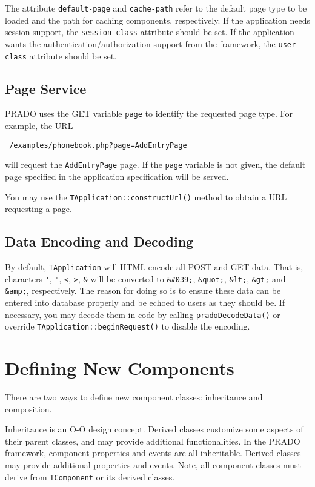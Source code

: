 \documentclass{book}
\begin{document}
The attribute \verb|default-page| and \verb|cache-path| refer to
the default page type to be loaded and the path for caching
components, respectively. If the application needs session
support, the \verb|session-class| attribute should be set. If the
application wants the authentication/authorization support from
the framework, the \verb|user-class| attribute should be set.



\subsection{Page Service}

PRADO uses the GET variable \verb|page| to identify the requested
page type. For example, the URL
\begin{verbatim}
 /examples/phonebook.php?page=AddEntryPage
\end{verbatim}
will request the \verb|AddEntryPage| page. If the \verb|page|
variable is not given, the default page specified in the
application specification will be served.


You may use the \verb|TApplication::constructUrl()| method to
obtain a URL requesting a page.



\subsection{Data Encoding and Decoding}

By default, \verb|TApplication| will HTML-encode all POST and GET
data. That is, characters \verb|'|, \verb|"|, \verb|<|, \verb|>|,
\verb|&| will be converted to \verb|&#039;|, \verb|&quot;|,
\verb|&lt;|, \verb|&gt;| and \verb|&amp;|, respectively. The
reason for doing so is to ensure these data can be entered into
database properly and be echoed to users as they should be. If
necessary, you may decode them in code by calling
\verb|pradoDecodeData()| or override
\verb|TApplication::beginRequest()| to disable the encoding.


\section{Defining New Components}

There are two ways to define new component classes: inheritance
and composition.


Inheritance is an O-O design concept. Derived classes customize
some aspects of their parent classes, and may provide additional
functionalities. In the PRADO framework, component properties and events
are all inheritable. Derived classes may provide
additional properties and events. Note, all component
classes must derive from \verb|TComponent| or its derived classes.
\end{document}

